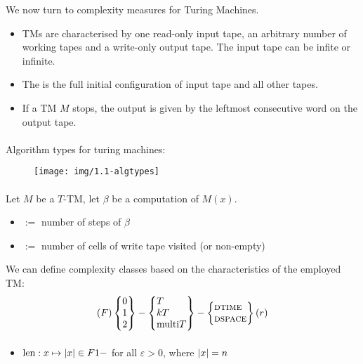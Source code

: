 \documentclass[10pt,twocolumn]{article}
\begin{document}
We now turn to complexity measures for Turing Machines.
\begin{itemize}
\item TMs are characterised by one read-only input tape, an arbitrary number of
  working tapes and a write-only output tape. The input tape can be
   infite or  infinite.
\item The  is the full initial configuration of input tape and all
  other tapes.
\item If a TM $M$ stops, the output is given by the leftmost consecutive word on
  the output tape.
\end{itemize}
\paragraph{} Algorithm types for turing machines:

\begin{figure}[h]
  \centering
  \texttt{[image: img/1.1-algtypes]}
\end{figure}

\paragraph{} Let $M$ be a $T$-TM, let $\beta$ be a computation of
$M(x)$.
\begin{itemize}
\item \tdtime{$\beta$} $:=$ number of steps of $\beta$
\item \tdtime{$\beta$} $:=$ number of cells of write tape visited (or non-empty)
\end{itemize}
We can define complexity classes based on the characteristics of the employed
TM:
\begin{align*}
  (F)
  \left\{
  \begin{tabular}{@{}l@{}}
    0 \\ 1 \\ 2
  \end{tabular}
  \right\}
  -
  \left\{
  \begin{tabular}{@{}l@{}}
    $T$ \\ $kT$ \\ $\text{multi}T$
  \end{tabular}
  \right\}
  -
  \left\{
  \begin{tabular}{@{}l@{}}
    \text{\textsc{dtime}} \\
    \text{\textsc{dspace}}
  \end{tabular}
  \right\}
  (r)
\end{align*}

\paragraph{}
\begin{itemize}
\item $\text{len}:x\mapsto \lvert x \rvert \in F1-$ for all
  $\varepsilon > 0$, where $\lvert x \rvert=n$
\end{itemize}
\end{document}
